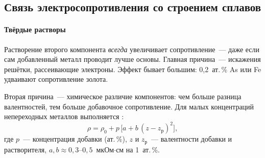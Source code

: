 \subsection{Связь электросопротивления со строением сплавов}\label{ssec:rho-alloys}

\paragraph{Твёрдые растворы}
Растворение второго компонента \emph{всегда} увеличивает сопротивление~—
даже если сам добавленный металл проводит лучше основы. Главная
причина~— искажения решётки, рассеивающие электроны. Эффект бывает
большим: 0,2~ат.\,\% As или Fe удваивают сопротивление золота.

Вторая причина~— химическое различие компонентов: чем больше разница
валентностей, тем больше добавочное сопротивление. Для малых
концентраций непереходных металлов выполняется :
\begin{equation}\label{eq:linde}
\rho=\rho_0+p\,\bigl[a+b\,(z-z_\text{р})^2\bigr],
\end{equation}
где $p$~— концентрация добавки (ат.\,\%), $z$ и $z_\text{р}$~— валентности
добавки и растворителя, $a,b\approx0{,}3$--$0{,}5$~мкОм$\cdot$см на 1~ат.\,\%.

